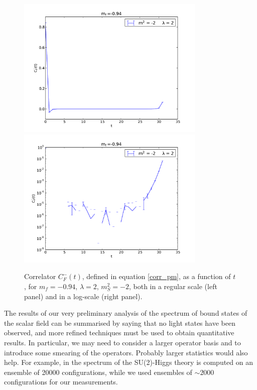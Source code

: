 \begin{figure}[thb] 
\begin{adjustwidth}{-4em}{-4em}
  \includegraphics[width=9cm,clip]{pics/spectrum_minus}\includegraphics[width=9cm,clip]{pics/spectrum_minus_log}
\end{adjustwidth}
  \caption{Correlator $C_F^-(t)$, defined in equation \ref{corr_pm}, as a function of $t$, for $m_f = -0.94$, $\lambda = 2$, $m_S^2 = -2$, both in a regular scale (left panel) and in a log-scale (right panel).}
  \label{spectrum_parity_minus}
\end{figure}


The results of our very preliminary analysis of the spectrum of bound states of the scalar field can be summarised by saying that no light states have been observed, and more refined techniques must be used to obtain quantitative results. In particular, we may need to consider a larger operator basis and to introduce some smearing of the operators. Probably larger statistics would also help. For example, in \cite{Wurtz:2013ova} the spectrum of the SU(2)-Higgs theory is computed on an ensemble of 20000 configurations, while we used ensembles of $\sim 2000$ configurations for our measurements. 


